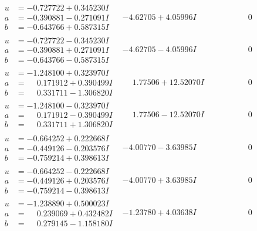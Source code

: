 \documentclass[1p]{elsarticle_modified}
\theoremstyle{definition}
\begin{document}
$$\begin{array}{c|c|c}
\begin{aligned}
u &= -0.727722 + 0.345230 I \\
a &= -0.390881 - 0.271091 I \\
b &= -0.643766 + 0.587315 I\end{aligned}
 & -4.62705 + 4.05996 I & \phantom{-0.000000 } 0 \\ \hline\begin{aligned}
u &= -0.727722 - 0.345230 I \\
a &= -0.390881 + 0.271091 I \\
b &= -0.643766 - 0.587315 I\end{aligned}
 & -4.62705 - 4.05996 I & \phantom{-0.000000 } 0 \\ \hline\begin{aligned}
u &= -1.248100 + 0.323970 I \\
a &= \phantom{-}0.171912 + 0.390499 I \\
b &= \phantom{-}0.331711 - 1.306820 I\end{aligned}
 & \phantom{-}1.77506 + 12.52070 I & \phantom{-0.000000 } 0 \\ \hline\begin{aligned}
u &= -1.248100 - 0.323970 I \\
a &= \phantom{-}0.171912 - 0.390499 I \\
b &= \phantom{-}0.331711 + 1.306820 I\end{aligned}
 & \phantom{-}1.77506 - 12.52070 I & \phantom{-0.000000 } 0 \\ \hline\begin{aligned}
u &= -0.664252 + 0.222668 I \\
a &= -0.449126 - 0.203576 I \\
b &= -0.759214 + 0.398613 I\end{aligned}
 & -4.00770 - 3.63985 I & \phantom{-0.000000 } 0 \\ \hline\begin{aligned}
u &= -0.664252 - 0.222668 I \\
a &= -0.449126 + 0.203576 I \\
b &= -0.759214 - 0.398613 I\end{aligned}
 & -4.00770 + 3.63985 I & \phantom{-0.000000 } 0 \\ \hline\begin{aligned}
u &= -1.238890 + 0.500023 I \\
a &= \phantom{-}0.239069 + 0.432482 I \\
b &= \phantom{-}0.279145 - 1.158180 I\end{aligned}
 & -1.23780 + 4.03638 I & \phantom{-0.000000 } 0 \\ \hline\begin{aligned}

\end{aligned}
\end{array}$$
\end{document}
